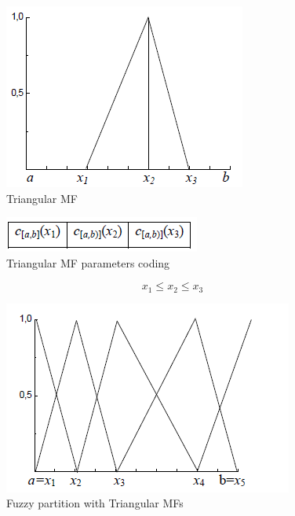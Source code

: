 \documentclass[runningheads,a4paper]{llncs}
\begin{document}
\begin{figure}[!ht]
	\begin{center}
		\includegraphics[scale=0.90]{fig/triangulaire}
		\caption {Triangular MF}
		\label{tri}
	\end{center}
\end{figure}


\begin{figure}[!ht]
	\begin{center}
		\includegraphics[scale=0.95]{fig/codage}
		\caption {Triangular MF parameters coding}
		\label{co} 
	\end{center}
\end{figure}

\begin{equation}\label{key}
x_{1} \leq x_{2} \leq x_{3}
\end{equation}

\begin{figure}[!ht]
	\begin{center}
		\includegraphics[scale=0.95]{fig/vl}
		\caption {Fuzzy partition with Triangular MFs}
		\label{vl} 
	\end{center}
\end{figure}
\end{document}
